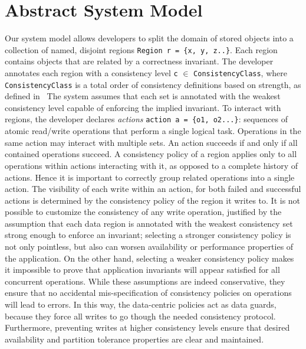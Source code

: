 \documentclass[preprint, numbers]{sigplanconf}
\begin{document}
\section{Abstract System Model}
Our system model allows developers to split the domain of stored objects into a
collection of named, disjoint
regions \texttt{Region r = \{x, y, z..\}}. Each
region contains objects that are related by a correctness invariant. The
developer annotates each region with a consistency level \texttt{c} $\in$
\texttt{ConsistencyClass}, where \texttt{ConsistencyClass} is a total order of
consistency definitions based on strength, as defined in~\cite{sivaramakrishnan2015declarative} The system assumes that each
set is annotated with the weakest consistency level capable of
enforcing the implied invariant. To interact with regions, the developer
declares \emph{actions} \texttt{action a = \{o1, o2...\}}: sequences of atomic
read/write operations that perform a single logical task.
Operations in the same action may interact with multiple sets. An action succeeds if and only if
all contained operations succeed. A consistency policy of a region applies only to
all operations within actions interacting with it, as opposed to a complete
history of actions. Hence it is important to
correctly group related operations into a single action. The visibility
of each write within an action, for both failed and successful
actions is determined by the consistency policy of the region it writes to. It
is not possible to customize the consistency of any write operation, justified
by the assumption that each data region is annotated with the weakest
consistency set strong enough to enforce an invariant; selecting a stronger
consistency policy is not only pointless, but also can worsen
availability or performance properties of the application. On the other hand,
selecting a weaker consistency policy makes it impossible to prove that
application invariants will appear satisfied for all concurrent operations.
While these assumptions are indeed conservative, they ensure that no accidental
mis-specification of consistency policies on operations will lead to errors. In this way, the
data-centric policies act as data guards, because they force all writes to go
though the needed consistency protocol. Furthermore, preventing writes at higher
consistency levels ensure that desired availability and partition tolerance
properties are clear and maintained. 
\end{document}
